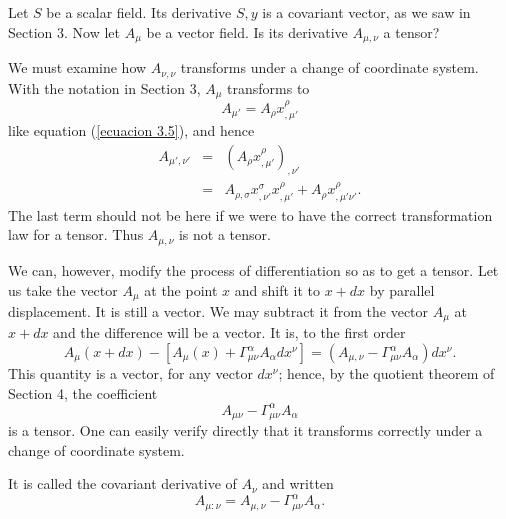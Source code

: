 Let $S$ be a scalar field. Its derivative $S,y$ is a covariant vector, as we 
saw in Section 3. Now let $A_\mu$ be a vector field. Is its derivative 
$A_{\mu,\nu}$ a tensor?

We must examine how $A_{\nu,\nu}$ transforms under a change of coordinate 
system. With the notation in Section 3, $A_\mu$ transforms to
\[
 A_{\mu'} = A_\rho x^\rho _{,\mu'}
\]
like equation (\ref{ecuacion 3.5}), and hence
\[
 \begin{array}{rcl}
  A_{\mu',\nu'} & = & \left( A_\rho x^\rho _{,\mu'} \right)_{,\nu'}\\
                & = & A_{\rho,\sigma} x^\sigma_{,\nu'} x^\rho_{,\mu'}
                + A_\rho x^\rho_{,\mu'\nu'} .
 \end{array}
\]
The last term should not be here if we were to have the correct transformation 
law for a tensor. Thus $A_{\mu,\nu}$ is not a tensor.

We can, however, modify the process of differentiation so as to get a tensor. 
Let us take the vector $A_\mu$ at the point $x$ and shift it to $x+dx$ by 
parallel displacement. It is still a vector. We may subtract it from the vector 
$A_\mu$ at $x+dx$ and the difference will be a vector. It is, to the first order
\[
 A_{\mu}(x + dx) - \left[ A_{\mu}(x) + \Gamma^\alpha_{\mu\nu}A_\alpha 
dx^\nu\right] = \left(A_{\mu,\nu} - \Gamma^\alpha_{\mu\nu} A_\alpha 
\right)dx^\nu .
\]
This quantity is a vector, for any vector $dx^\nu$; hence, by the quotient 
theorem of Section 4, the coefficient
\[
 A_{\mu\nu} - \Gamma^\alpha_{\mu\nu} A_\alpha
\]
is a tensor. One can easily verify directly that it transforms correctly under 
a change of coordinate system.

It is called the covariant derivative of $A_\nu$ and written
\begin{equation}
 \label{ecuacion 10.1}
 A_{\mu:\nu} = A_{\mu,\nu} - \Gamma^\alpha_{\mu\nu}A_\alpha. 
\end{equation}


